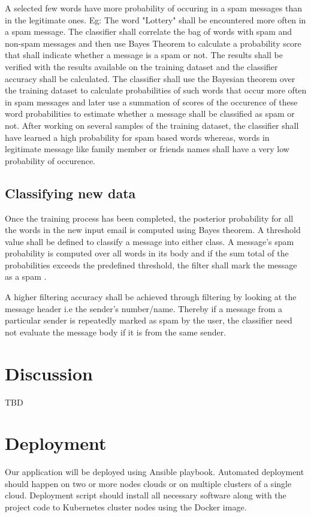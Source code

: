 \documentclass[9pt,twocolumn,twoside]{../../styles/osajnl}
\begin{document}
A selected few words have more probability of occuring in a spam
messages than in the legitimate ones. Eg: The word "Lottery" shall be
encountered more often in a spam message.  The classifier shall
correlate the bag of words with spam and non-spam messages and then
use Bayes Theorem to calculate a probability score that shall indicate
whether a message is a spam or not. The results shall be verified with
the results available on the training dataset and the classifier
accuracy shall be calculated.  The classifier shall use the Bayesian
theorem over the training dataset to calculate probabilities of such
words that occur more often in spam messages and later use a summation
of scores of the occurence of these word probabilities to estimate
whether a message shall be classified as spam or not. After working on
several samples of the training dataset, the classifier shall have
learned a high probability for spam based words whereas, words in
legitimate message like family member or friends names shall have a
very low probability of occurence.

\subsection{Classifying new data}

Once the training process has been completed, the posterior
probability for all the words in the new input email is computed using
Bayes theorem. A threshold value shall be defined to classify a
message into either class. A message's spam probability is computed
over all words in its body and if the sum total of the probabilities
exceeds the predefined threshold, the filter shall mark the message as
a spam \cite{www-wiki-naivebayes}.

A higher filtering accuracy shall be achieved through filtering by
looking at the message header i.e the sender's number/name. Thereby if
a message from a particular sender is repeatedly marked as spam by the
user, the classifier need not evaluate the message body if it is from
the same sender.


\section{Discussion}
TBD


\section{Deployment}
Our application will be deployed using Ansible \cite{www-ansible}
playbook. Automated deployment should happen on two or more nodes
clouds or on multiple clusters of a single cloud. Deployment script
should install all necessary software along with the project code to
Kubernetes cluster nodes using the Docker image.
\end{document}
